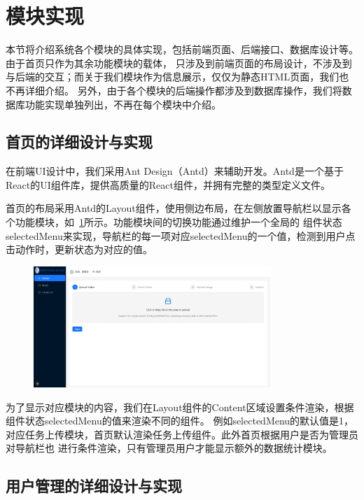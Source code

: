 \section{模块实现}

本节将介绍系统各个模块的具体实现，包括前端页面、后端接口、数据库设计等。由于首页只作为其余功能模块的载体，
只涉及到前端页面的布局设计，不涉及到与后端的交互；而关于我们模块作为信息展示，仅仅为静态HTML页面，我们也不再详细介绍。
另外，由于各个模块的后端操作都涉及到数据库操作，我们将数据库功能实现单独列出，不再在每个模块中介绍。

\subsection{首页的详细设计与实现}

在前端UI设计中，我们采用Ant Design（Antd）来辅助开发。Antd是一个基于React的UI组件库，提供高质量的React组件，并拥有完整的类型定义文件。

首页的布局采用Antd的Layout组件，使用侧边布局，在左侧放置导航栏以显示各个功能模块，如~\ref{fig:app-dashboard}所示。功能模块间的切换功能通过维护一个全局的
组件状态selectedMenu来实现，导航栏的每一项对应selectedMenu的一个值，检测到用户点击动作时，更新状态为对应的值。

\begin{figure}[ht]
    \centering
    \includegraphics[width=0.8\textwidth]{source/img/app_dashboard.png}
    \label{fig:app-dashboard}
\end{figure}

为了显示对应模块的内容，我们在Layout组件的Content区域设置条件渲染，根据组件状态selectedMenu的值来渲染不同的组件。
例如selectedMenu的默认值是1，对应任务上传模块，首页默认渲染任务上传组件。此外首页根据用户是否为管理员对导航栏也
进行条件渲染，只有管理员用户才能显示额外的数据统计模块。

\subsection{用户管理的详细设计与实现}

